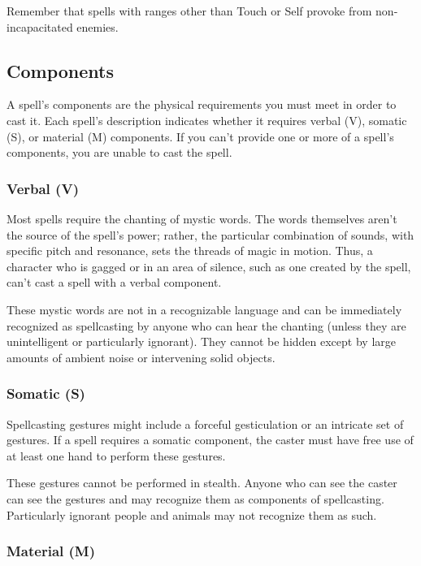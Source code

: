 Remember that spells with ranges other than Touch or Self provoke  from non-incapacitated enemies.

\subsection{Components}

A spell's components are the physical requirements you must meet in order to cast it. Each spell's description indicates whether it requires verbal (V), somatic (S), or material (M) components. If you can't provide one or more of a spell's components, you are unable to cast the spell.

\subsubsection{Verbal (V)}

Most spells require the chanting of mystic words. The words themselves aren't the source of the spell's power; rather, the particular combination of sounds, with specific pitch and resonance, sets the threads of magic in motion. Thus, a character who is gagged or in an area of silence, such as one created by the  spell, can't cast a spell with a verbal component.

These mystic words are not in a recognizable language and can be immediately recognized as spellcasting by anyone who can hear the chanting (unless they are unintelligent or particularly ignorant). They cannot be hidden except by large amounts of ambient noise or intervening solid objects.

\subsubsection{Somatic (S)}

Spellcasting gestures might include a forceful gesticulation or an intricate set of gestures. If a spell requires a somatic component, the caster must have free use of at least one hand to perform these gestures.

These gestures cannot be performed in stealth. Anyone who can see the caster can see the gestures and may recognize them as components of spellcasting. Particularly ignorant people and animals may not recognize them as such.

\subsubsection{Material (M)}

